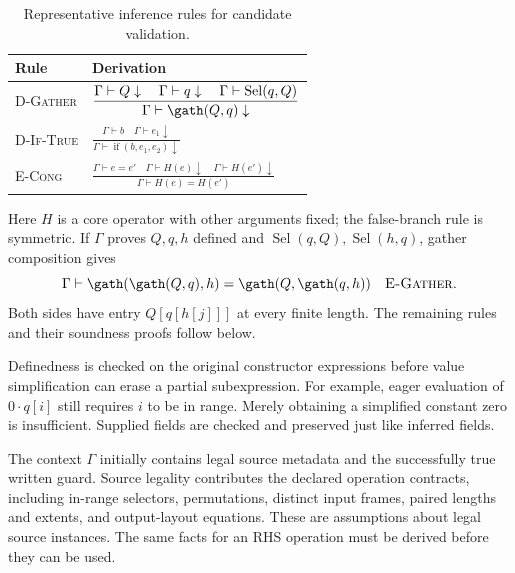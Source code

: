 \begin{table}[!htbp]
\caption{Representative inference rules for candidate validation.}
\label{tab:metadata-definedness}
\small
\begin{tabularx}{\linewidth}{@{}lY@{}}\toprule
Rule & Derivation\\\midrule
\textsc{D-Gather} &
$\displaystyle
 \frac{\Gamma\vdash Q\downarrow\quad\Gamma\vdash q\downarrow
       \quad\Gamma\vdash\operatorname{Sel}(q,Q)}
      {\Gamma\vdash\gath(Q,q)\downarrow}$\\[6pt]
\textsc{D-If-True} &
$\displaystyle
 \frac{\Gamma\vdash b\quad\Gamma\vdash e_1\downarrow}
      {\Gamma\vdash\operatorname{if}(b,e_1,e_2)\downarrow}$\\[6pt]
\textsc{E-Cong} &
$\displaystyle
 \frac{\Gamma\vdash e=e'\quad\Gamma\vdash H(e)\downarrow
       \quad\Gamma\vdash H(e')\downarrow}
      {\Gamma\vdash H(e)=H(e')}$\\[2pt]\bottomrule
\end{tabularx}
\end{table}
Here $H$ is a core operator with other arguments fixed; the false-branch
rule is symmetric. If $\Gamma$ proves $Q,q,h$ defined and
$\operatorname{Sel}(q,Q),\operatorname{Sel}(h,q)$, gather composition gives
\begin{equation}
 \Gamma\vdash\gath(\gath(Q,q),h)=\gath(Q,\gath(q,h))
 \quad\text{\textsc{E-Gather}}.
 \label{eq:validated-gather}
\end{equation}
Both sides have entry $Q[q[h[j]]]$ at every finite length.
The remaining rules and their soundness proofs follow below.

Definedness is checked on the original constructor expressions before
value simplification can erase a partial subexpression. For example,
eager evaluation of $0\cdot q[i]$ still requires $i$ to be in range.
Merely obtaining a simplified constant zero is insufficient. Supplied
fields are checked and preserved just like inferred fields.


The context $\Gamma$ initially contains legal source metadata and the
successfully true written guard. Source legality contributes the declared
operation contracts, including in-range selectors, permutations, distinct
input frames, paired lengths and extents, and output-layout equations.
These are assumptions about legal source instances. The same facts for an
RHS operation must be derived before they can be used.

